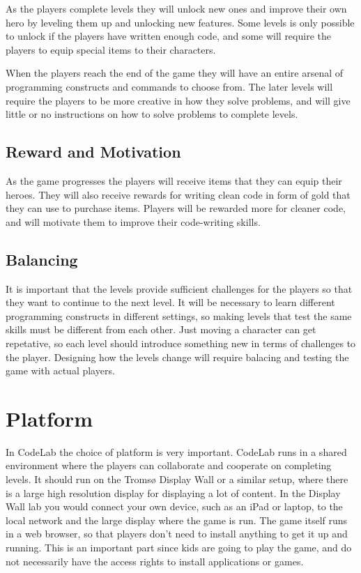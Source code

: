 \documentclass[12pt,journal,compsoc, a4paper, onecolumn]{IEEEtran}
\begin{document}
As the players complete levels they will unlock new ones and improve their own
hero by leveling them up and unlocking new features. Some levels is only
possible to unlock if the players have written enough code, and some will
require the players to equip special items to their characters.

When the players reach the end of the game they will have an entire arsenal of
programming constructs and commands to choose from. The later levels will
require the players to be more creative in how they solve problems, and will
give little or no instructions on how to solve problems to complete levels. 


\subsection{Reward and Motivation} 
As the game progresses the players will receive items that they can equip their
heroes. They will also receive rewards for writing clean code in form of gold
that they can use to purchase items. Players will be rewarded more for cleaner
code, and will motivate them to improve their code-writing skills. 

\subsection{Balancing} 
It is important that the levels provide sufficient challenges for the players so
that they want to continue to the next level. It will be necessary to learn
different programming constructs in different settings, so making levels that
test the same skills must be different from each other. Just moving a character
can get repetative, so each level should introduce something new in terms of
challenges to the player. Designing how the levels change will require balacing
and testing the game with actual players. 

\section{Platform} 
In CodeLab the choice of platform is very important. CodeLab runs in a shared
environment where the players can collaborate and cooperate on completing
levels. It should run on the Tromsø Display Wall or a similar setup, where there
is a large high resolution display for displaying a lot of content. In
the Display Wall lab you would connect your own device, such as an iPad or
laptop, to the local network and the large display where the game is run.
The game itself runs in a web browser, so that players don't need to install
anything to get it up and running. This is an important part since kids are
going to play the game, and do not necessarily have the access rights to install
applications or games. 
\end{document}
